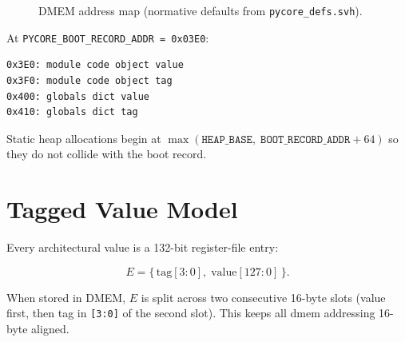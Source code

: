 \documentclass[11pt,a4paper]{article}
\newcommand{\bitfield}[1]{\texttt{#1}}
\begin{document}
\begin{figure}[htbp]
\centering
{}
\caption{DMEM address map (normative defaults from \texttt{pycore\_defs.svh}).}
\label{fig:memmap}
\end{figure}

\begin{normbox}
At \texttt{PYCORE\_BOOT\_RECORD\_ADDR = 0x03E0}:
\begin{verbatim}
0x3E0: module code object value
0x3F0: module code object tag
0x400: globals dict value
0x410: globals dict tag
\end{verbatim}
Static heap allocations begin at $\max(\texttt{HEAP\_BASE},\;
\texttt{BOOT\_RECORD\_ADDR}+64)$ so they do not collide with the boot record.
\end{normbox}

\section{Tagged Value Model}
\label{sec:tags}

Every architectural value is a 132-bit register-file entry:

\begin{equation}
  E = \{\,\mathrm{tag}[3{:}0],\; \mathrm{value}[127{:}0]\,\}.
\end{equation}

When stored in DMEM, $E$ is split across two consecutive 16-byte slots
(value first, then tag in \bitfield{[3:0]} of the second slot). This keeps all
dmem addressing 16-byte aligned.
\end{document}

